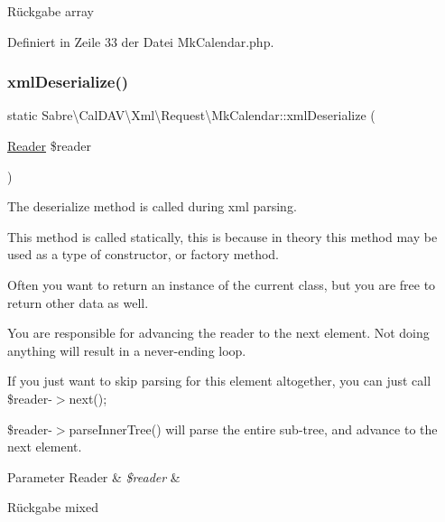 \begin{DoxyReturn}{Rückgabe}
array 
\end{DoxyReturn}


Definiert in Zeile 33 der Datei Mk\+Calendar.\+php.

\mbox{\label{class_sabre_1_1_cal_d_a_v_1_1_xml_1_1_request_1_1_mk_calendar_a5ab27ded4ef932547ef3accc5a3fc13c}} 
\subsubsection{\texorpdfstring{xml\+Deserialize()}{xmlDeserialize()}}
{\footnotesize\ttfamily static Sabre\textbackslash{}\+Cal\+D\+A\+V\textbackslash{}\+Xml\textbackslash{}\+Request\textbackslash{}\+Mk\+Calendar\+::xml\+Deserialize (\begin{DoxyParamCaption}\item[{\mbox{\hyperlink{class_sabre_1_1_xml_1_1_reader}{Reader}}}]{\$reader }\end{DoxyParamCaption})\hspace{0.3cm}{\ttfamily [static]}}

The deserialize method is called during xml parsing.

This method is called statically, this is because in theory this method may be used as a type of constructor, or factory method.

Often you want to return an instance of the current class, but you are free to return other data as well.

You are responsible for advancing the reader to the next element. Not doing anything will result in a never-\/ending loop.

If you just want to skip parsing for this element altogether, you can just call \$reader-\/$>$next();

\$reader-\/$>$parse\+Inner\+Tree() will parse the entire sub-\/tree, and advance to the next element.


\begin{DoxyParams}[1]{Parameter}
Reader & {\em \$reader} & \\
\hline
\end{DoxyParams}
\begin{DoxyReturn}{Rückgabe}
mixed 
\end{DoxyReturn}


